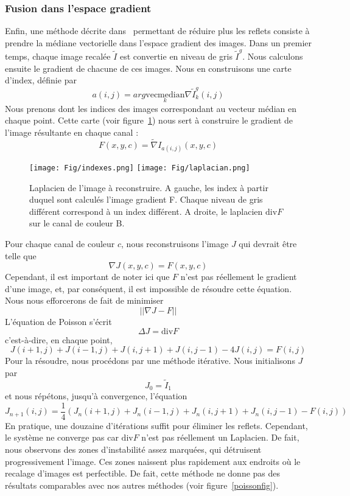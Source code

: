 \documentclass[12pt,a4paper]{article}
\begin{document}
\subsubsection{Fusion dans l'espace gradient}
\label{fusiongrad}
Enfin, une méthode décrite dans~\citep{haro2012photographing} permettant de réduire plus les reflets consiste à prendre la médiane vectorielle dans l'espace gradient des images. Dans un premier temps, chaque image recalée $\tilde I$ est convertie en niveau de gris $\tilde I^g$. Nous calculons ensuite le gradient de chacune de ces images. Nous en construisons une carte d'index, définie par
\[
a(i,j) = arg\underset{k}{\mathrm{vecmedian}}\nabla\tilde I^g_k(i,j)
\]
Nous prenons dont les indices des images correspondant au vecteur médian en chaque point. Cette carte (voir figure~\ref{indexes}) nous sert à construire le gradient de l'image résultante en chaque canal :
\[
F(x,y,c) = \tilde \nabla I_{a(i,j)}(x,y,c)
\]
\begin{figure}
\centering
\texttt{[image: Fig/indexes.png]}
\texttt{[image: Fig/laplacian.png]}
\caption{Laplacien de l'image à reconstruire. A gauche, les index à partir duquel sont calculés l'image gradient F. Chaque niveau de gris différent correspond à un index différent. A droite, le laplacien $\mathrm{div}F$ sur le canal de couleur B.}
\label{indexes}
\end{figure}
Pour chaque canal de couleur $c$, nous reconstruisons l'image $J$ qui devrait être telle que
\[
\nabla J(x,y,c) = F(x,y,c)
\]
Cependant, il est important de noter ici que $F$ n'est pas réellement le gradient d'une image, et, par conséquent, il est impossible de résoudre cette équation. Nous nous efforcerons de fait de minimiser
\[
||\nabla J - F||
\]
L'équation de Poisson s'écrit
\[
\Delta J = \mathrm{div} F
\]
c'est-à-dire, en chaque point,
\[
J(i+1,j)+J(i-1,j)+J(i,j+1)+J(i,j-1)-4J(i,j)=F(i,j)
\]
Pour la résoudre, nous procédons par une méthode itérative. Nous initialisons $J$ par
\[J_0 = \tilde I_1\]
et nous répétons, jusqu'à convergence, l'équation
\[
J_{n+1}(i,j) = \frac{1}{4}\left(J_n(i+1,j)+J_n(i-1,j)+J_n(i,j+1)+J_n(i,j-1)-F(i,j)\right)
\]
En pratique, une douzaine d'itérations suffit pour éliminer les reflets. Cependant, le système ne converge pas car $\mathrm{div} F$ n'est pas réellement un Laplacien. De fait, nous observons des zones d'instabilité assez marquées, qui détruisent progressivement l'image. Ces zones naissent plus rapidement aux endroits où le recalage d'images est perfectible. De fait, cette méthode ne donne pas des résultats comparables avec nos autres méthodes (voir figure~\ref{poissonfig}).
\end{document}
